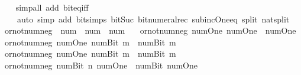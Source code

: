 \begin{isabellebody}
%
\isadelimproof
\ \ %
\endisadelimproof
%
\isatagproof
{}\isamarkupfalse%
\ {\isacharparenleft}{\kern0pt}simp{\isacharunderscore}{\kern0pt}all\ add{\isacharcolon}{\kern0pt}\ bit{\isacharunderscore}{\kern0pt}eq{\isacharunderscore}{\kern0pt}iff{\isacharparenright}{\kern0pt}\isanewline
\ \ \ \ {\isacharparenleft}{\kern0pt}auto\ simp\ add{\isacharcolon}{\kern0pt}\ bit{\isacharunderscore}{\kern0pt}simps\ bit{\isacharunderscore}{\kern0pt}Suc\ bit{\isacharunderscore}{\kern0pt}numeral{\isacharunderscore}{\kern0pt}rec\ sub{\isacharunderscore}{\kern0pt}inc{\isacharunderscore}{\kern0pt}One{\isacharunderscore}{\kern0pt}eq\ split{\isacharcolon}{\kern0pt}\ nat{\isachardot}{\kern0pt}split{\isacharparenright}{\kern0pt}%
\endisatagproof
{\isafoldproof}%
%
\isadelimproof
\isanewline
%
\endisadelimproof
\isanewline
{}\isamarkupfalse%
\ or{\isacharunderscore}{\kern0pt}not{\isacharunderscore}{\kern0pt}num{\isacharunderscore}{\kern0pt}neg\ {\isacharcolon}{\kern0pt}{\isacharcolon}{\kern0pt}\ {\isacartoucheopen}num\ {\isasymRightarrow}\ num\ {\isasymRightarrow}\ num{\isacartoucheclose}\ \isanewline
{}\isanewline
\ \ {\isacartoucheopen}or{\isacharunderscore}{\kern0pt}not{\isacharunderscore}{\kern0pt}num{\isacharunderscore}{\kern0pt}neg\ num{\isachardot}{\kern0pt}One\ num{\isachardot}{\kern0pt}One\ {\isacharequal}{\kern0pt}\ num{\isachardot}{\kern0pt}One{\isacartoucheclose}\isanewline
{\isacharbar}{\kern0pt}\ {\isacartoucheopen}or{\isacharunderscore}{\kern0pt}not{\isacharunderscore}{\kern0pt}num{\isacharunderscore}{\kern0pt}neg\ num{\isachardot}{\kern0pt}One\ {\isacharparenleft}{\kern0pt}num{\isachardot}{\kern0pt}Bit{}\ m{\isacharparenright}{\kern0pt}\ {\isacharequal}{\kern0pt}\ num{\isachardot}{\kern0pt}Bit{}\ m{\isacartoucheclose}\isanewline
{\isacharbar}{\kern0pt}\ {\isacartoucheopen}or{\isacharunderscore}{\kern0pt}not{\isacharunderscore}{\kern0pt}num{\isacharunderscore}{\kern0pt}neg\ num{\isachardot}{\kern0pt}One\ {\isacharparenleft}{\kern0pt}num{\isachardot}{\kern0pt}Bit{}\ m{\isacharparenright}{\kern0pt}\ {\isacharequal}{\kern0pt}\ num{\isachardot}{\kern0pt}Bit{}\ m{\isacartoucheclose}\isanewline
{\isacharbar}{\kern0pt}\ {\isacartoucheopen}or{\isacharunderscore}{\kern0pt}not{\isacharunderscore}{\kern0pt}num{\isacharunderscore}{\kern0pt}neg\ {\isacharparenleft}{\kern0pt}num{\isachardot}{\kern0pt}Bit{}\ n{\isacharparenright}{\kern0pt}\ num{\isachardot}{\kern0pt}One\ {\isacharequal}{\kern0pt}\ num{\isachardot}{\kern0pt}Bit{}\ num{\isachardot}{\kern0pt}One{\isacartoucheclose}\isanewline

\end{isabellebody}
